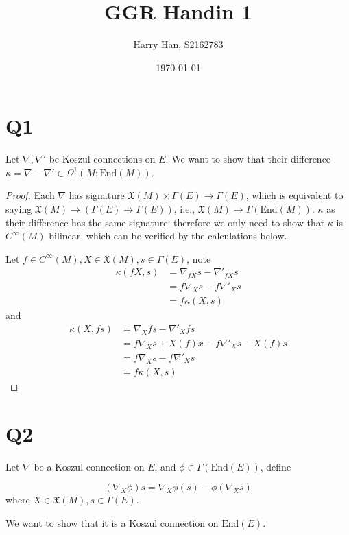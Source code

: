\documentclass{article}
\title{GGR Handin 1}
\author{Harry Han, S2162783}
\date{\today}
\theoremstyle{definition}
\theoremstyle{definition}
\theoremstyle{remark}
\newcommand{\X}{\mathfrak{X}}
\newcommand{\G}{\Gamma}
\newcommand{\End}{\text{End}}
\newcommand{\C}{C^{\infty}}
\begin{document}
\maketitle

\section*{Q1}

Let $\nabla, \nabla'$ be Koszul connections on $E$. We want to show that their difference $\kappa = \nabla - \nabla' \in \Omega^1(M; \End(M))$.

\begin{proof}
	Each $\nabla$ has signature $\mathfrak{X}(M) \times \Gamma(E) \rightarrow  \Gamma(E)$, which is equivalent to saying $\X(M) \rightarrow (\G(E) \rightarrow \Gamma(E))$, i.e., $\X(M) \rightarrow \G(\End(M))$.
	$\kappa$ as their difference has the same signature; therefore we only need to show that $\kappa$ is $\C(M)$ bilinear, which can be verified by the calculations below. 

	Let $f \in \C(M), X \in \X(M), s \in \G(E)$, note 
	\begin{align*}
		\kappa(fX, s) 
		&= \nabla_{fX} s - \nabla'_{fX} s \\
		&= f\nabla_{X} s - f\nabla'_{X} s \\ 
		&= f\kappa(X, s)
	\end{align*}
	and 
	\begin{align*}
		\kappa(X, fs) 
		&= \nabla_{X} fs - \nabla'_{X} fs \\
		&= f\nabla_{X} s + X(f)x - f\nabla'_{X} s - X(f)s\\
		&= f\nabla_{X} s - f\nabla'_{X} s \\ 
		&= f\kappa(X, s)
	\end{align*}
\end{proof}

\section*{Q2}

Let $\nabla $ be a Koszul connection on $E$, and $\phi \in \G(\End(E))$, define 

\begin{equation}
	(\nabla_{X}\phi)s =  \nabla_{X}\phi(s) - \phi(\nabla_X s)
\end{equation}
where $X \in \X(M), s \in \G(E)$.

We want to show that it is a Koszul connection on $\End(E)$.
\end{document}
